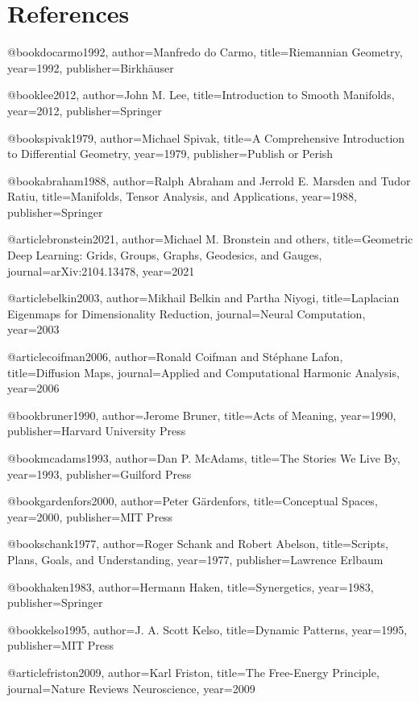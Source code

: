 
\section*{References}


@book{docarmo1992,
  author={Manfredo do Carmo},
  title={Riemannian Geometry},
  year={1992},
  publisher={Birkhäuser}
}

@book{lee2012,
  author={John M. Lee},
  title={Introduction to Smooth Manifolds},
  year={2012},
  publisher={Springer}
}

@book{spivak1979,
  author={Michael Spivak},
  title={A Comprehensive Introduction to Differential Geometry},
  year={1979},
  publisher={Publish or Perish}
}

@book{abraham1988,
  author={Ralph Abraham and Jerrold E. Marsden and Tudor Ratiu},
  title={Manifolds, Tensor Analysis, and Applications},
  year={1988},
  publisher={Springer}
}

@article{bronstein2021,
  author={Michael M. Bronstein and others},
  title={Geometric Deep Learning: Grids, Groups, Graphs, Geodesics, and Gauges},
  journal={arXiv:2104.13478},
  year={2021}
}

@article{belkin2003,
  author={Mikhail Belkin and Partha Niyogi},
  title={Laplacian Eigenmaps for Dimensionality Reduction},
  journal={Neural Computation},
  year={2003}
}

@article{coifman2006,
  author={Ronald Coifman and Stéphane Lafon},
  title={Diffusion Maps},
  journal={Applied and Computational Harmonic Analysis},
  year={2006}
}

@book{bruner1990,
  author={Jerome Bruner},
  title={Acts of Meaning},
  year={1990},
  publisher={Harvard University Press}
}

@book{mcadams1993,
  author={Dan P. McAdams},
  title={The Stories We Live By},
  year={1993},
  publisher={Guilford Press}
}

@book{gardenfors2000,
  author={Peter Gärdenfors},
  title={Conceptual Spaces},
  year={2000},
  publisher={MIT Press}
}

@book{schank1977,
  author={Roger Schank and Robert Abelson},
  title={Scripts, Plans, Goals, and Understanding},
  year={1977},
  publisher={Lawrence Erlbaum}
}

@book{haken1983,
  author={Hermann Haken},
  title={Synergetics},
  year={1983},
  publisher={Springer}
}

@book{kelso1995,
  author={J. A. Scott Kelso},
  title={Dynamic Patterns},
  year={1995},
  publisher={MIT Press}
}

@article{friston2009,
  author={Karl Friston},
  title={The Free-Energy Principle},
  journal={Nature Reviews Neuroscience},
  year={2009}
}
